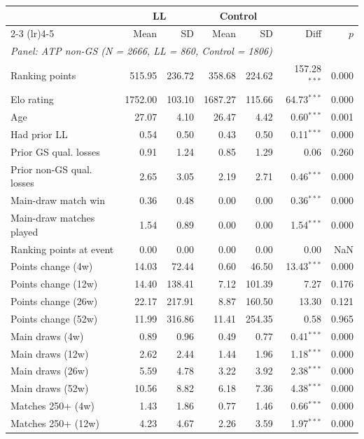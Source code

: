 \begin{tabular}{l rr rr rr}
\toprule
 & \multicolumn{2}{c}{LL} & \multicolumn{2}{c}{Control} & & \\
\cmidrule(lr){2-3} \cmidrule(lr){4-5}
 & Mean & SD & Mean & SD & Diff & $p$ \\
\midrule
\multicolumn{7}{l}{\textit{Panel: ATP non-GS (N = 2666, LL = 860, Control = 1806)}} \\
\addlinespace
\quad Ranking points & 515.95 & 236.72 & 358.68 & 224.62 & 157.28$^{***}$ & 0.000 \\
\quad Elo rating & 1752.00 & 103.10 & 1687.27 & 115.66 & 64.73$^{***}$ & 0.000 \\
\quad Age & 27.07 & 4.10 & 26.47 & 4.42 & 0.60$^{***}$ & 0.001 \\
\quad Had prior LL & 0.54 & 0.50 & 0.43 & 0.50 & 0.11$^{***}$ & 0.000 \\
\quad Prior GS qual. losses & 0.91 & 1.24 & 0.85 & 1.29 & 0.06 & 0.260 \\
\quad Prior non-GS qual. losses & 2.65 & 3.05 & 2.19 & 2.71 & 0.46$^{***}$ & 0.000 \\
\quad Main-draw match win & 0.36 & 0.48 & 0.00 & 0.00 & 0.36$^{***}$ & 0.000 \\
\quad Main-draw matches played & 1.54 & 0.89 & 0.00 & 0.00 & 1.54$^{***}$ & 0.000 \\
\quad Ranking points at event & 0.00 & 0.00 & 0.00 & 0.00 & 0.00 & NaN \\
\quad Points change (4w) & 14.03 & 72.44 & 0.60 & 46.50 & 13.43$^{***}$ & 0.000 \\
\quad Points change (12w) & 14.40 & 138.41 & 7.12 & 101.39 & 7.27 & 0.176 \\
\quad Points change (26w) & 22.17 & 217.91 & 8.87 & 160.50 & 13.30 & 0.121 \\
\quad Points change (52w) & 11.99 & 316.86 & 11.41 & 254.35 & 0.58 & 0.965 \\
\quad Main draws (4w) & 0.89 & 0.96 & 0.49 & 0.77 & 0.41$^{***}$ & 0.000 \\
\quad Main draws (12w) & 2.62 & 2.44 & 1.44 & 1.96 & 1.18$^{***}$ & 0.000 \\
\quad Main draws (26w) & 5.59 & 4.78 & 3.22 & 3.92 & 2.38$^{***}$ & 0.000 \\
\quad Main draws (52w) & 10.56 & 8.82 & 6.18 & 7.36 & 4.38$^{***}$ & 0.000 \\
\quad Matches 250+ (4w) & 1.43 & 1.86 & 0.77 & 1.46 & 0.66$^{***}$ & 0.000 \\
\quad Matches 250+ (12w) & 4.23 & 4.67 & 2.26 & 3.59 & 1.97$^{***}$ & 0.000 \\

\end{tabular}
